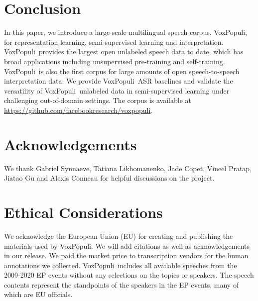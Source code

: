 \documentclass[11pt,a4paper]{article}
\newcommand{\vp}{VoxPopuli}
\begin{document}
\section{Conclusion}

In this paper, we introduce a large-scale multilingual speech corpus, \vp, for representation learning, semi-supervised learning and interpretation. \vp~provides the largest open unlabeled speech data to date, which has broad applications including unsupervised pre-training and self-training. \vp~is also the first corpus for large amounts of open speech-to-speech interpretation data.
We provide \vp~ASR baselines and validate the versatility of \vp~unlabeled data in semi-supervised learning under challenging out-of-domain settings. The corpus is available
at \url{https://github.com/facebookresearch/voxpopuli}.


\section{Acknowledgements}
We thank Gabriel Synnaeve, Tatiana Likhomanenko, Jade Copet, Vineel Pratap, Jiatao Gu and Alexis Conneau for helpful discussions on the project.

\section{Ethical Considerations}
We acknowledge the European Union (EU) for creating and publishing the materials used by \vp.
We will add citations as well as acknowledgements in our release.
We paid the market price to transcription vendors for the human annotations we collected. \vp~includes all available speeches from the 2009-2020 EP events without any selections on the topics or speakers. The speech contents represent the standpoints of the speakers in the EP events, many of which are EU officials.



\end{document}
